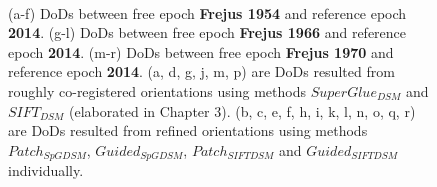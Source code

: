 \begin{figure}[htbp]
\begin{center}
{\begin{minipage}[t]{0.31\linewidth}
			\end{minipage}%
		}
		\\
		
		\caption{{\scriptsize (a-f) \ac{DoD}s between free epoch \textbf{Frejus 1954} and reference epoch \textbf{2014}. (g-l) \ac{DoD}s between free epoch \textbf{Frejus 1966} and reference epoch \textbf{2014}. (m-r) \ac{DoD}s between free epoch \textbf{Frejus 1970} and reference epoch \textbf{2014}. (a, d, g, j, m, p) are \ac{DoD}s resulted from roughly co-registered orientations using methods $SuperGlue_{DSM}$ and $SIFT_{DSM}$ (elaborated in Chapter 3). (b, c, e, f, h, i, k, l, n, o, q, r) are \ac{DoD}s resulted from refined orientations using methods $Patch_{SpGDSM}$, $Guided_{SpGDSM}$, $Patch_{SIFTDSM}$ and $Guided_{SIFTDSM}$ individually.}}
		\label{PreciseDoDFrejus}
	\end{center}
\end{figure} 



